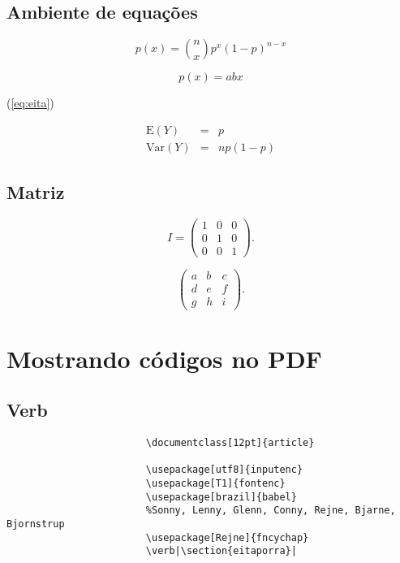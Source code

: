 \documentclass[12pt]{report}
\begin{document}
			\subsection{Ambiente de equações}
			
				\par \[ p(x)=\binom{n}{x}p^x(1-p)^{n-x} \]
			
				\begin{equation}
					p(x)=abx
					\label{eq:eita}
				\end{equation}
			
				(\ref{eq:eita})
				
				\begin{eqnarray}
					\mbox{E}(Y) &=& p\\
					\nonumber \mbox{Var}(Y) &=& np(1-p)
				\end{eqnarray}
			
			\subsection{Matriz}
			
			\[ I=\left(\begin{array}{ccc}
				1 & 0 & 0\\
				0 & 1 & 0\\
				0 & 0 & 1
			\end{array}\right).\]
		
			\[ \left(\begin{array}{lll}
				a & b & c \\
				d & e & f \\
				g & h & i
			\end{array}\right).\]
		
			
		\section{Mostrando códigos no PDF}
			\subsection{Verb}
			
					\begin{verbatim}
						\documentclass[12pt]{article}
					
						\usepackage[utf8]{inputenc}
						\usepackage[T1]{fontenc}
						\usepackage[brazil]{babel}
						%Sonny, Lenny, Glenn, Conny, Rejne, Bjarne, Bjornstrup
						\usepackage[Rejne]{fncychap}
						\verb|\section{eitaporra}|
					\end{verbatim}
				
\end{document}
